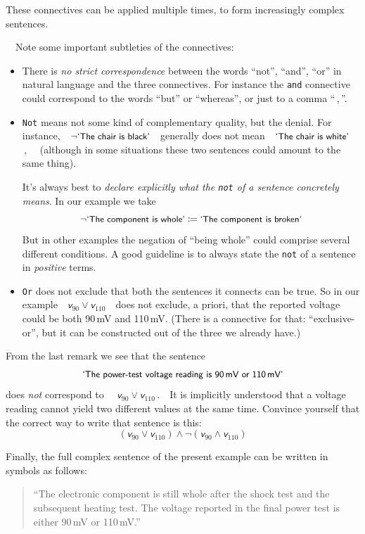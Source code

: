 \documentclass[
  a4paper,
  DIV=11,
  numbers=noendperiod,
  oneside]{scrreprt}
\begin{document}
These connectives can be applied multiple times, to form increasingly
complex sentences.

~~Note some important subtleties of the
connectives:

\begin{itemize}
\item
  There is \emph{no strict correspondence} between the words ``not'',
  ``and'', ``or'' in natural language and the three connectives. For
  instance the \texttt{and} connective could correspond to the words
  ``but'' or ``whereas'', or just to a comma ``\,,\,''.
\item
  \texttt{Not} means not some kind of complementary quality, but the
  denial. For
  instance,~~\(\lnot\textsf{\small`The chair is black'}\)~~generally
  does not mean~~{\(\textsf{\small`The chair is white'}\)\,,}~~
  (although in some situations these two sentences could amount to the
  same thing).

  It's always best to \emph{declare explicitly what the \texttt{not} of
  a sentence concretely means}. In our example we take \[
    \lnot\textsf{\small`The component is whole'} \coloneqq \textsf{\small`The component is broken'}
    \] But in other examples the negation of ``being whole'' could
  comprise several different conditions. A good guideline is to always
  state the \texttt{not} of a sentence in \emph{positive} terms.
\item
  \texttt{Or} does not exclude that both the sentences it connects can
  be true. So in our
  example~~\(\mathsfit{v}_{90} \lor \mathsfit{v}_{110}\)~~does not
  exclude, a priori, that the reported voltage could be both 90\,mV and
  110\,mV. (There is a connective for that: ``exclusive-or'', but it can
  be constructed out of the three we already have.)
\end{itemize}

From the last remark we see that the sentence \[
\textsf{\small`The power-test voltage reading is 90\,mV or 110\,mV'}
\] does \emph{not} correspond to
~~{\(\mathsfit{v}_{90} \lor \mathsfit{v}_{110}\)\,.}~~It is implicitly
understood that a voltage reading cannot yield two different values at
the same time. Convince yourself that the correct way to write that
sentence is this: \[
(\mathsfit{v}_{90} \lor \mathsfit{v}_{110})
\land
\lnot(\mathsfit{v}_{90} \land \mathsfit{v}_{110})
\]

Finally, the full complex sentence of the present example can be written
in symbols as follows:

\begin{quote}
``{The electronic component is still whole after the shock test} and
{the subsequent heating test}. {The voltage reported in the final power
test is} either {90\,mV} or {110\,mV}.''
\end{quote}
\end{document}
